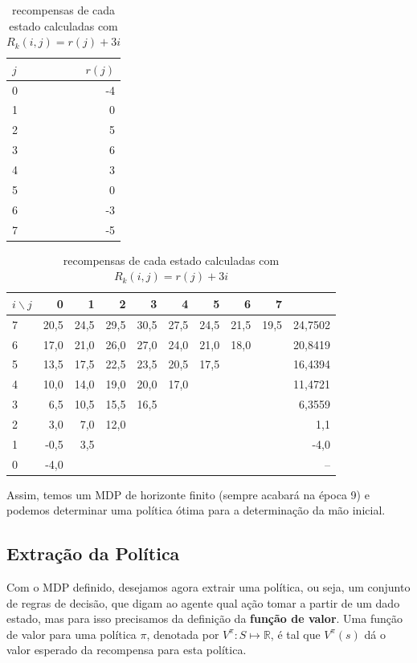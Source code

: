 \documentclass[dvipsnames]{book}
\begin{document}
\begin{table}[!h]
\parbox{.25\linewidth}{
\centering
\vspace{0.2cm}
\begin{tabular}{l|r}
$j$  & $r(j)$ \\ \hline
0 & -4  \\
1 & 0     \\
2 & 5      \\
3 & 6      \\
4 & 3     \\
5 & 0    \\
6 & -3     \\
7 & -5
\end{tabular}
\caption{recompensas-base para $j = 0, \ldots, 7$}
\label{tab:rjdraw}
}
\hfill
\parbox{.70\linewidth}{
\centering
\begin{tabular}{l|rrrrrrrr|r}
$i \backslash j$ & 0     & 1  & 2  & 3  & 4  & 5  & 6  & 7  & \\ \hline
7 & 20,5 & 24,5 & 29,5 & 30,5 & 27,5 & 24,5 & 21,5 & 19,5 & 24,7502 \\
6 & 17,0 & 21,0 & 26,0 & 27,0 & 24,0 & 21,0 & 18,0 && 20,8419 \\
5 & 13,5 & 17,5 & 22,5 & 23,5 & 20,5 & 17,5 &&& 16,4394 \\
4 & 10,0 & 14,0 & 19,0 & 20,0 & 17,0 &&&& 11,4721 \\
3 & 6,5 & 10,5 & 15,5 & 16,5 &&&&& 6,3559 \\
2 & 3,0 & 7,0 & 12,0 &&&&&& 1,1 \\
1 & -0,5 & 3,5 &&&&&&& -4,0 \\
0 & -4,0 &&&&&&&& --
\end{tabular}
\caption{recompensas de cada estado calculadas com $R_k(i,j) = r(j) + 3i$}
\label{tab:Rijdraw}
}
\end{table}
Assim, temos um MDP de horizonte finito (sempre acabará na época 9) e podemos determinar uma política ótima para a determinação da mão inicial.

\subsection{Extração da Política}
Com o MDP definido, desejamos agora extrair uma política, ou seja, um conjunto de regras
de decisão, que digam ao agente qual ação tomar a partir de um dado estado, mas para isso
precisamos da definição da \textbf{função de valor}. Uma função de valor para uma política
$\pi$, denotada por $V^\pi: S \mapsto \mathbb{R}$, é tal que $V^\pi(s)$ dá o valor esperado
da recompensa para esta política.
\end{document}
